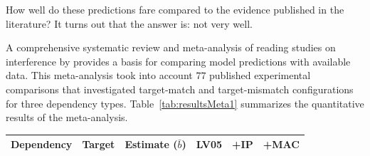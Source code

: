 \documentclass{cambridge7A}\usepackage[]{graphicx}\usepackage[]{color}
\newcommand{\xmark}{\ding{55}}%
\newcommand{\revSV}[1]{#1}
\begin{document}
How well do these predictions fare compared to the evidence published in the literature? It turns out that the answer is: not very well. 
\revSV{
A comprehensive systematic review and meta-analysis of reading studies on interference by \cite{JaegerEngelmannVasishth2017} provides a basis for comparing model predictions with available data. This meta-analysis took into account $77$ published experimental comparisons that investigated target-match and target-mismatch configurations for three dependency types.
Table~\ref{tab:resultsMeta1} summarizes the quantitative results of the meta-analysis.


\begin{table}[!htbp]
\begin{center}
{\small
\begin{tabular}{lllccc}
    \hline
Dependency            & Target                        & Estimate ($\bar{b}$)                                                                                                      & LV05                     & +IP       & +MAC \\
\hline


\end{tabular}}
\end{center}
\end{table}}
\end{document}
